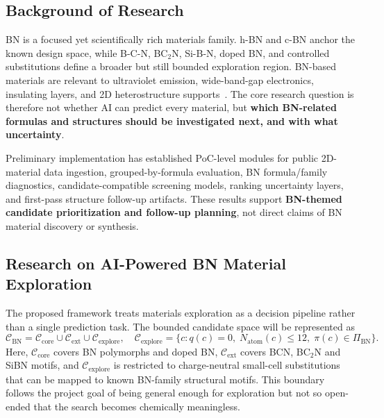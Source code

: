 \documentclass[12pt,a4paper]{article}
\begin{document}
\subsection{Background of Research}
\label{sec:background}
BN is a focused yet scientifically rich materials family. h-BN and c-BN anchor the known design space, while B-C-N, BC$_2$N, Si-B-N, doped BN, and controlled substitutions define a broader but still bounded exploration region. BN-based materials are relevant to ultraviolet emission, wide-band-gap electronics, insulating layers, and 2D heterostructure supports~\cite{watanabe2004_hbn_uv,cassabois2016_hbn_indirect,dean2010_hbn_graphene}. The core research question is therefore not whether AI can predict every material, but \textbf{which BN-related formulas and structures should be investigated next, and with what uncertainty}.

Preliminary implementation has established PoC-level modules for public 2D-material data ingestion, grouped-by-formula evaluation, BN formula/family diagnostics, candidate-compatible screening models, ranking uncertainty layers, and first-pass structure follow-up artifacts. These results support \textbf{BN-themed candidate prioritization and follow-up planning}, not direct claims of BN material discovery or synthesis.

\vspace{-10pt}
\subsection{Research on AI-Powered BN Material Exploration}
\label{sec:bn-ai-exploration}
The proposed framework treats materials exploration as a decision pipeline rather than a single prediction task. The bounded candidate space will be represented as
\begin{equation}
  \mathcal{C}_{\mathrm{BN}}=
  \mathcal{C}_{\mathrm{core}}\cup\mathcal{C}_{\mathrm{ext}}\cup\mathcal{C}_{\mathrm{explore}},
  \quad
  \mathcal{C}_{\mathrm{explore}}=
  \{c:q(c)=0,\;N_{\mathrm{atom}}(c)\le 12,\;\pi(c)\in\Pi_{\mathrm{BN}}\}.
\end{equation}
Here, $\mathcal{C}_{\mathrm{core}}$ covers BN polymorphs and doped BN, $\mathcal{C}_{\mathrm{ext}}$ covers BCN, BC$_2$N and SiBN motifs, and $\mathcal{C}_{\mathrm{explore}}$ is restricted to charge-neutral small-cell substitutions that can be mapped to known BN-family structural motifs. This boundary follows the project goal of being general enough for exploration but not so open-ended that the search becomes chemically meaningless.
\end{document}
